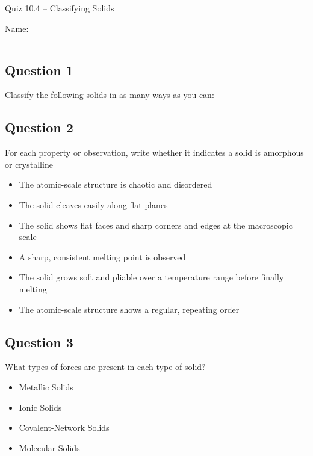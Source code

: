 \documentclass[11pt, letterpaper]{memoir}
\begin{document}
	\begin{center}
		{\large	Quiz 10.4 -- Classifying Solids}
	\end{center}
	{\large Name: \rule[-1mm]{4in}{.1pt} 
	
	\subsection*{Question 1}
	Classify the following solids in as many ways as you can:
	
	
	\vspace{3em}
	\subsection*{Question 2}
  For each property or observation, write whether it indicates a solid is amorphous or crystalline

  \begin{itemize}
    \item The atomic-scale structure is chaotic and disordered
    \item The solid cleaves easily along flat planes
    \item The solid shows flat faces and sharp corners and edges at the macroscopic scale
    \item A sharp, consistent melting point is observed
    \item The solid grows soft and pliable over a temperature range before finally melting
    \item The atomic-scale structure shows a regular, repeating order
  \end{itemize}

  \vspace{2em}
  \subsection*{Question 3}
  What types of forces are present in each type of solid?
  \begin{itemize}
    \item Metallic Solids
    \item Ionic Solids
    \item Covalent-Network Solids
    \item Molecular Solids
  \end{itemize}


}
\end{document}
